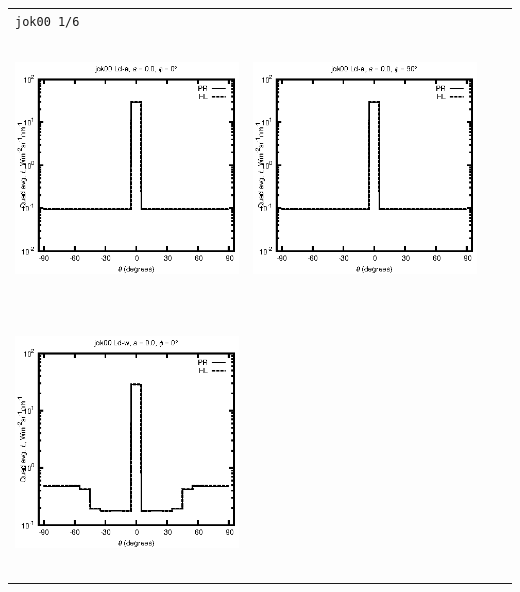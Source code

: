 \documentclass[10pt,a4paper]{article}
\begin{document}
\begin{adjustwidth}{-1.2in}{-1.2in}%

\pagebreak

\begin{tabular}{c c c c}
\multicolumn{4}{l}{\texttt{jok00 1/6}} \\
\includegraphics[height=7cm]{../eps/jok00_Ld_a_fwd.eps} &
\includegraphics[height=7cm]{../eps/jok00_Ld_a_cross.eps}\\
\includegraphics[height=7cm]{../eps/jok00_Ld_w_fwd.eps} &

\end{tabular}
\end{adjustwidth}
\end{document}
